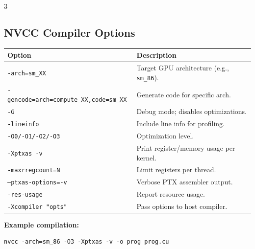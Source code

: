 \begin{multicols*}{3}
\subsection*{NVCC Compiler Options}

\begin{tabularx}{\linewidth}{lX}
\hline
\textbf{Option} & \textbf{Description} \\
\hline
\texttt{-arch=sm\_XX}        & Target GPU architecture (e.g., \texttt{sm\_86}). \\
\texttt{-gencode=arch=compute\_XX,code=sm\_XX} & Generate code for specific arch. \\
\texttt{-G}                  & Debug mode; disables optimizations. \\
\texttt{-lineinfo}           & Include line info for profiling. \\
\texttt{-O0/-O1/-O2/-O3}     & Optimization level. \\
\texttt{-Xptxas -v}          & Print register/memory usage per kernel. \\
\texttt{-maxrregcount=N}     & Limit registers per thread. \\
\texttt{--ptxas-options=-v}  & Verbose PTX assembler output. \\
\texttt{-res-usage}          & Report resource usage. \\
\texttt{-Xcompiler "opts"}   & Pass options to host compiler. \\
\hline
\end{tabularx}

\textbf{Example compilation:}
\begin{mdframed}[nobreak=true,backgroundcolor=gray!10,linecolor=Firebrick4]
\begin{verbatim}
nvcc -arch=sm_86 -O3 -Xptxas -v -o prog prog.cu
\end{verbatim}
\end{mdframed}


\end{multicols*}

